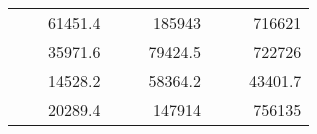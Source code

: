 \begin{table}[H]
\begin{tabular}{|ccrccrccc}
\rowcolor[HTML]{DDFDFF} 
\multicolumn{1}{|c|}{\cellcolor[HTML]{FFFFC7}}                                & \multicolumn{1}{c|}{\cellcolor[HTML]{DDFDFF}}                      & \multicolumn{1}{r|}{\cellcolor[HTML]{DAE8FC}61451.4}   & \multicolumn{1}{c|}{\cellcolor[HTML]{FFFFC7}}                                & \multicolumn{1}{c|}{\cellcolor[HTML]{DDFDFF}}                       & \multicolumn{1}{r|}{\cellcolor[HTML]{DDFDFF}185943}    & \multicolumn{1}{c|}{\cellcolor[HTML]{FFFFC7}}                                & \multicolumn{1}{c|}{\cellcolor[HTML]{DDFDFF}}                      & \multicolumn{1}{r|}{\cellcolor[HTML]{DDFDFF}716621}    \\ \cline{3-3} \cline{6-6} \cline{9-9} 
\multicolumn{1}{|c|}{\cellcolor[HTML]{FFFFC7}}                                & \multicolumn{1}{c|}{\cellcolor[HTML]{DDFDFF}}                      & \multicolumn{1}{r|}{\cellcolor[HTML]{DDFDFF}35971.6}   & \multicolumn{1}{c|}{\cellcolor[HTML]{FFFFC7}}                                & \multicolumn{1}{c|}{\cellcolor[HTML]{DDFDFF}}                       & \multicolumn{1}{r|}{\cellcolor[HTML]{DAE8FC}79424.5}   & \multicolumn{1}{c|}{\cellcolor[HTML]{FFFFC7}}                                & \multicolumn{1}{c|}{\cellcolor[HTML]{DDFDFF}}                      & \multicolumn{1}{r|}{\cellcolor[HTML]{DAE8FC}722726}    \\ \cline{3-3} \cline{6-6} \cline{9-9} 
\rowcolor[HTML]{DDFDFF} 
\multicolumn{1}{|c|}{\cellcolor[HTML]{FFFFC7}}                                & \multicolumn{1}{c|}{\cellcolor[HTML]{DDFDFF}}                      & \multicolumn{1}{r|}{\cellcolor[HTML]{DAE8FC}14528.2}   & \multicolumn{1}{c|}{\cellcolor[HTML]{FFFFC7}}                                & \multicolumn{1}{c|}{\cellcolor[HTML]{DDFDFF}}                       & \multicolumn{1}{r|}{\cellcolor[HTML]{DDFDFF}58364.2}   & \multicolumn{1}{c|}{\cellcolor[HTML]{FFFFC7}}                                & \multicolumn{1}{c|}{\cellcolor[HTML]{DDFDFF}}                      & \multicolumn{1}{r|}{\cellcolor[HTML]{DDFDFF}43401.7}   \\ \cline{3-3} \cline{6-6} \cline{9-9} 
\multicolumn{1}{|c|}{\cellcolor[HTML]{FFFFC7}}                                & \multicolumn{1}{c|}{\cellcolor[HTML]{DDFDFF}}                      & \multicolumn{1}{r|}{\cellcolor[HTML]{DDFDFF}20289.4}   & \multicolumn{1}{c|}{\cellcolor[HTML]{FFFFC7}}                                & \multicolumn{1}{c|}{\cellcolor[HTML]{DDFDFF}}                       & \multicolumn{1}{r|}{\cellcolor[HTML]{DAE8FC}147914}    & \multicolumn{1}{c|}{\cellcolor[HTML]{FFFFC7}}                                & \multicolumn{1}{c|}{\cellcolor[HTML]{DDFDFF}}                      & \multicolumn{1}{r|}{\cellcolor[HTML]{DAE8FC}756135}    \\ \cline{3-3} \cline{6-6} \cline{9-9} 

\end{tabular}
\end{table}
